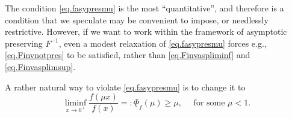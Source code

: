 \documentclass[a4paper,10pt,reqno]{amsart}
\numberwithin{equation}{section}
\newtheorem{lemma}{Lemma}
\theoremstyle{definition}
\theoremstyle{remark}
\DeclareMathOperator{\1}{\mathbbm 1}
\begin{document}
	
	The condition \eqref{eq.fasypresmu} is the most ``quantitative'', and therefore is a condition that we speculate may be convenient to impose, or needlessly restrictive. However, if we want to work within the framework of asymptotic preserving $F^{-1}$, even a modest relaxation of \eqref{eq.fasypresmu} forces e.g., \eqref{eq.Finvnotpres} to be satisfied, rather than \eqref{eq.Finvaspliminf} and \eqref{eq.Finvasplimsup}.
	
	A rather natural way to violate \eqref{eq.fasypresmu} is to change it to
	\begin{equation} \label{eq.fnotasypresmu}
		\liminf_{x\to 0^+} \frac{f(\mu x)}{f(x)}=:\underline{\Phi}_f(\mu)\geq \mu, \quad \text{ for some $\mu<1$}.
	\end{equation}
	
\end{document}
